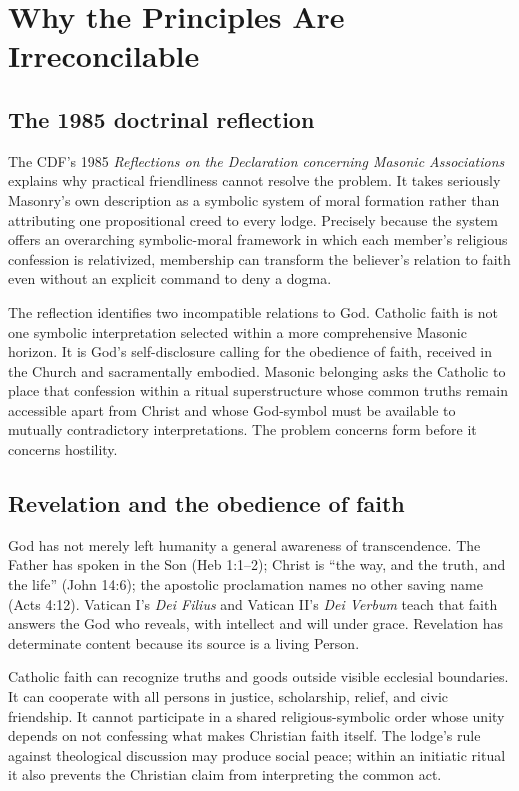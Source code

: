\section{Why the Principles Are Irreconcilable}

\subsection{The 1985 doctrinal reflection}

The CDF's 1985 \emph{Reflections on the Declaration concerning Masonic Associations} explains why practical friendliness cannot resolve the problem. It takes seriously Masonry's own description as a symbolic system of moral formation rather than attributing one propositional creed to every lodge. Precisely because the system offers an overarching symbolic-moral framework in which each member's religious confession is relativized, membership can transform the believer's relation to faith even without an explicit command to deny a dogma.

The reflection identifies two incompatible relations to God. Catholic faith is not one symbolic interpretation selected within a more comprehensive Masonic horizon. It is God's self-disclosure calling for the obedience of faith, received in the Church and sacramentally embodied. Masonic belonging asks the Catholic to place that confession within a ritual superstructure whose common truths remain accessible apart from Christ and whose God-symbol must be available to mutually contradictory interpretations. The problem concerns form before it concerns hostility.

\subsection{Revelation and the obedience of faith}

God has not merely left humanity a general awareness of transcendence. The Father has spoken in the Son (Heb 1:1--2); Christ is “the way, and the truth, and the life” (John 14:6); the apostolic proclamation names no other saving name (Acts 4:12). Vatican I's \emph{Dei Filius} and Vatican II's \emph{Dei Verbum} teach that faith answers the God who reveals, with intellect and will under grace. Revelation has determinate content because its source is a living Person.

Catholic faith can recognize truths and goods outside visible ecclesial boundaries. It can cooperate with all persons in justice, scholarship, relief, and civic friendship. It cannot participate in a shared religious-symbolic order whose unity depends on not confessing what makes Christian faith itself. The lodge's rule against theological discussion may produce social peace; within an initiatic ritual it also prevents the Christian claim from interpreting the common act.

